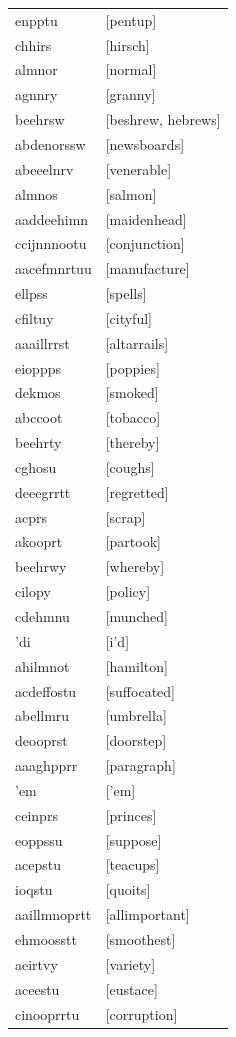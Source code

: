 \documentclass{article}
\begin{document}
\begin{tabular}{ll}
enpptu & [pentup] \\
chhirs & [hirsch] \\
almnor & [normal] \\
agnnry & [granny] \\
beehrsw & [beshrew, hebrews] \\
abdenorssw & [newsboards] \\
abeeelnrv & [venerable] \\
almnos & [salmon] \\
aaddeehimn & [maidenhead] \\
ccijnnnootu & [conjunction] \\
aacefmnrtuu & [manufacture] \\
ellpss & [spells] \\
cfiltuy & [cityful] \\
aaaillrrst & [altarrails] \\
eioppps & [poppies] \\
dekmos & [smoked] \\
abccoot & [tobacco] \\
beehrty & [thereby] \\
cghosu & [coughs] \\
deeegrrtt & [regretted] \\
acprs & [scrap] \\
akooprt & [partook] \\
beehrwy & [whereby] \\
cilopy & [policy] \\
cdehmnu & [munched] \\
'di & [i'd] \\
ahilmnot & [hamilton] \\
acdeffostu & [suffocated] \\
abellmru & [umbrella] \\
deooprst & [doorstep] \\
aaaghpprr & [paragraph] \\
'em & ['em] \\
ceinprs & [princes] \\
eoppssu & [suppose] \\
acepstu & [teacups] \\
ioqstu & [quoits] \\
aaillmnoprtt & [allimportant] \\
ehmoosstt & [smoothest] \\
aeirtvy & [variety] \\
aceestu & [eustace] \\
cinooprrtu & [corruption] \\

\end{tabular}
\end{document}
